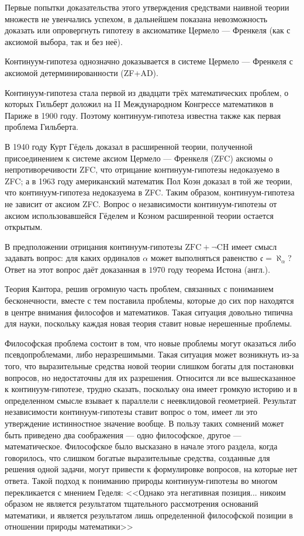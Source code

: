 \documentclass[12pt, specialist, subf, substylefile = spbu.rtx]{disser}
\begin{document}
Первые попытки доказательства этого утверждения средствами наивной теории множеств не увенчались успехом, в дальнейшем показана невозможность доказать или опровергнуть гипотезу в аксиоматике Цермело — Френкеля (как с аксиомой выбора, так и без неё).

Континуум-гипотеза однозначно доказывается в системе Цермело — Френкеля с аксиомой детерминированности (ZF+AD).

Континуум-гипотеза стала первой из двадцати трёх математических проблем, о которых Гильберт доложил на II Международном Конгрессе математиков в Париже в 1900 году. Поэтому континуум-гипотеза известна также как первая проблема Гильберта.

В 1940 году Курт Гёдель доказал в расширенной теории, полученной присоединением к системе аксиом Цермело — Френкеля (ZFC) аксиомы о непротиворечивости ZFC, что отрицание континуум-гипотезы недоказуемо в ZFC; а в 1963 году американский математик Пол Коэн доказал в той же теории, что континуум-гипотеза недоказуема в ZFC. Таким образом, континуум-гипотеза не зависит от аксиом ZFC. Вопрос о независимости континуум-гипотезы от аксиом использовавшейся Гёделем и Коэном расширенной теории остается открытым.

В предположении отрицания континуум-гипотезы $\mathrm {ZFC+\neg CH}$  имеет смысл задавать вопрос: для каких ординалов $\alpha$  может выполняться равенство $\mathfrak {c}=\aleph _{\alpha }$? Ответ на этот вопрос даёт доказанная в $1970$ году теорема Истона (англ.).

Теория Кантора, решив огромную часть проблем, связанных с пониманием бесконечности, вместе с тем поставила проблемы, которые до сих пор находятся в центре внимания философов и математиков. Такая ситуация довольно типична для науки, поскольку каждая новая теория ставит новые нерешенные проблемы.

Философская проблема состоит в том, что новые проблемы могут оказаться либо псевдопроблемами, либо неразрешимыми. Такая ситуация может возникнуть из-за того, что выразительные средства новой теории слишком богаты для постановки вопросов, но недостаточны для их разрешения. Относится ли все вышесказанное к континуум-гипотезе, трудно сказать, поскольку она имеет громкую историю и в определенном смысле взывает к параллели с неевклидовой геометрией.
Результат независимости континуум-гипотезы ставит вопрос о том, имеет ли это утверждение истинностное значение вообще. В пользу таких сомнений может быть приведено два соображения — одно философское, другое — математическое. Философское было высказано в начале этого раздела, когда говорилось, что слишком богатые выразительные средства, созданные для решения одной задачи, могут привести к формулировке вопросов, на которые нет ответа. Такой подход к пониманию природы континуум-гипотезы во многом перекликается с мнением Геделя: <<Однако эта негативная позиция... никоим образом не является результатом тщательного рассмотрения оснований математики, и является результатом лишь определенной философской позиции в отношении природы математики>>
\end{document}
